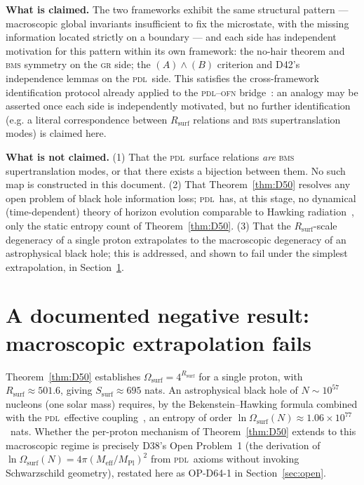 \documentclass[12pt,a4paper]{article}
\newcommand{\PDL}{\textsc{pdl}}
\newcommand{\Rsurf}{R_{\mathrm{surf}}}
\newcommand{\Omegasurf}{\Omega_{\mathrm{surf}}}
\newcommand{\Ssurf}{S_{\mathrm{surf}}}
\newcommand{\Meff}{M_{\mathrm{eff}}}
\newcommand{\MPl}{M_{\mathrm{Pl}}}
\begin{document}
\begin{speculativebox}
\textbf{What is claimed.} The two frameworks exhibit the same structural pattern --- macroscopic global invariants insufficient to fix the microstate, with the missing information located strictly on a boundary --- and each side has independent motivation for this pattern within its own framework: the no-hair theorem and \textsc{bms} symmetry on the \textsc{gr} side; the $(A)\wedge(B)$ criterion and D42's independence lemmas on the \PDL\ side. This satisfies the cross-framework identification protocol already applied to the \PDL--\textsc{ofn} bridge~\cite{N02}: an analogy may be asserted once each side is independently motivated, but no further identification (e.g. a literal correspondence between $\Rsurf$ relations and \textsc{bms} supertranslation modes) is claimed here.

\textbf{What is not claimed.} (1) That the \PDL\ surface relations \emph{are} \textsc{bms} supertranslation modes, or that there exists a bijection between them. No such map is constructed in this document. (2) That Theorem~\ref{thm:D50} resolves any open problem of black hole information loss; \PDL\ has, at this stage, no dynamical (time-dependent) theory of horizon evolution comparable to Hawking radiation~\cite{Hawking1975}, only the static entropy count of Theorem~\ref{thm:D50}. (3) That the $\Rsurf$-scale degeneracy of a single proton extrapolates to the macroscopic degeneracy of an astrophysical black hole; this is addressed, and shown to fail under the simplest extrapolation, in Section~\ref{sec:negative}.
\end{speculativebox}

\section{A documented negative result: macroscopic extrapolation fails}
\label{sec:negative}

Theorem~\ref{thm:D50} establishes $\Omegasurf = 4^{\Rsurf}$ for a single proton, with $\Rsurf \approx 501.6$, giving $\Ssurf \approx 695$ nats. An astrophysical black hole of $N \sim 10^{57}$ nucleons (one solar mass) requires, by the Bekenstein--Hawking formula combined with the \PDL\ effective coupling~\cite{PDL_D38_2026}, an entropy of order $\ln\Omegasurf(N) \approx 1.06\times10^{77}$~nats. Whether the per-proton mechanism of Theorem~\ref{thm:D50} extends to this macroscopic regime is precisely D38's Open Problem~1 (the derivation of $\ln\Omegasurf(N)=4\pi(\Meff/\MPl)^2$ from \PDL\ axioms without invoking Schwarzschild geometry), restated here as OP-D64-1 in Section~\ref{sec:open}.
\end{document}
